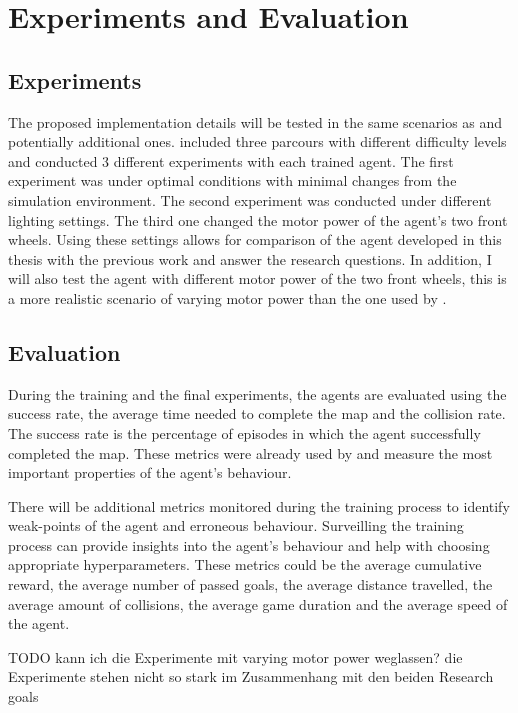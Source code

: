 \chapter{Experiments and Evaluation}
\label{cha:Experiments and Evaluation}

\section{Experiments}

The proposed implementation details will be tested in the same scenarios as \autocite{maximilian} and potentially additional ones. \autocite{maximilian} included three parcours with different difficulty levels and conducted 3 different experiments with each trained agent. The first experiment was under optimal conditions with minimal changes from the simulation environment. The second experiment was conducted under different lighting settings. The third one changed the motor power of the agent's two front wheels. Using these settings allows for comparison of the agent developed in this thesis with the previous work and answer the research questions.
In addition, I will also test the agent with different motor power of the two front wheels, this is a more realistic scenario of varying motor power than the one used by \autocite{maximilian}.

\section{Evaluation}

During the training and the final experiments, the agents are evaluated using the success rate, the average time needed to complete the map and the collision rate. The success rate is the percentage of episodes in which the agent successfully completed the map. These metrics were already used by \autocite{maximilian} and measure the most important properties of the agent's behaviour.

There will be additional metrics monitored during the training process to identify weak-points of the agent and erroneous behaviour. Surveilling the training process can provide insights into the agent's behaviour and help with choosing appropriate hyperparameters.
These metrics could be the average cumulative reward, the average number of passed goals, the average distance travelled, the average amount of collisions, the average game duration and the average speed of the agent.



TODO kann ich die Experimente mit varying motor power weglassen?
die Experimente stehen nicht so stark im Zusammenhang mit den beiden Research goals